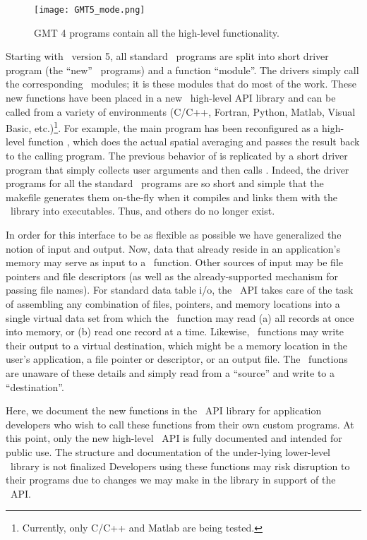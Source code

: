 \documentclass{report}
\begin{document}
\begin{figure}[h]
	\centering
	\texttt{[image: GMT5\_mode.png]}
	\caption{GMT 4 programs contain all the high-level functionality.}
\end{figure}
Starting with \GMT\ version 5, all standard \GMT\ programs are split into short driver
program (the ``new'' \GMT\  programs) and a function ``module''.  The drivers simply call the corresponding \GMT\ modules;
it is these modules that do most of the work.  These new functions have been placed
in a new \GMT\ high-level API library and can be called from a variety of environments
(C/C++, Fortran, Python, Matlab, Visual Basic, etc.)\footnote{Currently, only C/C++ and Matlab are being tested.}.
For example, the main program
 has been reconfigured as a high-level function ,
which does the actual spatial averaging and passes the result back to the calling program.
The previous behavior of  is replicated by a short driver program
that simply collects user arguments and then calls .  Indeed, the driver
programs for all the standard \GMT\ programs are so short and simple that the makefile generates them
on-the-fly when it compiles and links them with the \GMT\ library into executables.
Thus,  and others do no longer exist.

In order for this interface to be as flexible as possible we have generalized the notion of input
and output. Now, data that already reside in an application's memory may serve as
input to a \GMT\ function.  Other sources of input may be file pointers
and file descriptors (as well as the already-supported mechanism for passing file names).
For standard data table i/o, the \GMT\ API takes care of the task of assembling any combination
of files, pointers, and memory locations into a single virtual data set from which the \GMT\
function may read (a) all records at once into memory, or (b) read one record at a time.
Likewise, \GMT\ functions may write their output to a virtual destination, which
might be a memory location in the user's application, a file pointer or descriptor, or
an output file.  The \GMT\ functions are unaware of these details and simply
read from a ``source'' and write to a ``destination''.

Here, we document the new functions in the \GMT\ API library for application developers
who wish to call these functions from their own custom programs.  At this point,
only the new high-level \GMT\ API is fully documented and intended for public use.
The structure and documentation of the under-lying lower-level \GMT\ library is not finalized
Developers using these functions may risk disruption to their programs due to changes we may
make in the library in support of the \GMT\ API.
\end{document}

